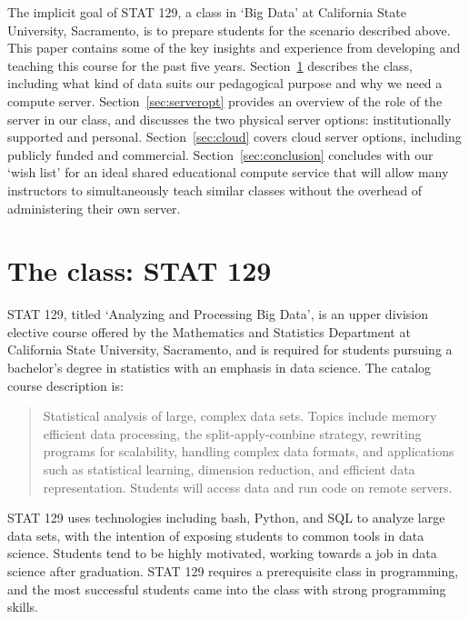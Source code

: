 \documentclass[12pt]{article}
\begin{document}
The implicit goal of STAT 129, a class in `Big Data' at California State University, Sacramento, is to prepare students for the scenario described above.
This paper contains some of the key insights and experience from developing and teaching this course for the past five years.
Section~\ref{sec:stat129} describes the class, including what kind of data suits our pedagogical purpose and why we need a compute server.
Section~\ref{sec:serveropt} provides an overview of the role of the server in our class, and discusses the two physical server options: institutionally supported and personal.
Section~\ref{sec:cloud} covers cloud server options, including publicly funded and commercial.
Section~\ref{sec:conclusion} concludes with our `wish list' for an ideal shared educational compute service that will allow many instructors to simultaneously teach similar classes without the overhead of administering their own server.


\section{The class: STAT 129}
\label{sec:stat129}

STAT 129, titled `Analyzing and Processing Big Data', is an upper division elective course offered by the Mathematics and Statistics Department at California State University, Sacramento, and is required for students pursuing a bachelor's degree in statistics with an emphasis in data science.
The catalog course description is:

\begin{quote}
Statistical analysis of large, complex data sets. Topics include memory efficient data processing, the split-apply-combine strategy, rewriting programs for scalability, handling complex data formats, and applications such as statistical learning, dimension reduction, and efficient data representation. Students will access data and run code on remote servers.
\end{quote}

STAT 129 uses technologies including bash, Python, and SQL to analyze large data sets, with the intention of exposing students to common tools in data science.
Students tend to be highly motivated, working towards a job in data science after graduation.
STAT 129 requires a prerequisite class in programming, and the most successful students came into the class with strong programming skills.

\end{document}
